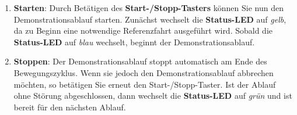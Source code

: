 \begin{enumerate}
	\item \textbf{Starten}: Durch Betätigen des \textbf{Start-/Stopp-Tasters} können Sie nun den Demonstrationsablauf starten. Zunächst wechselt die \textbf{Status-LED} auf \textit{gelb}, da zu Beginn eine notwendige Referenzfahrt ausgeführt wird. Sobald die \textbf{Status-LED} auf \textit{blau} wechselt, beginnt der Demonstrationsablauf.
	
	\item \textbf{Stoppen}: Der Demonstrationsablauf stoppt automatisch am Ende des Bewegungszyklus. Wenn sie jedoch den Demonstrationsablauf abbrechen möchten, so betätigen Sie erneut den Start-/Stopp-Taster. Ist der Ablauf ohne Störung abgeschlossen, dann wechselt die \textbf{Status-LED} auf \textit{grün} und ist bereit für den nächsten Ablauf.
\end{enumerate}


